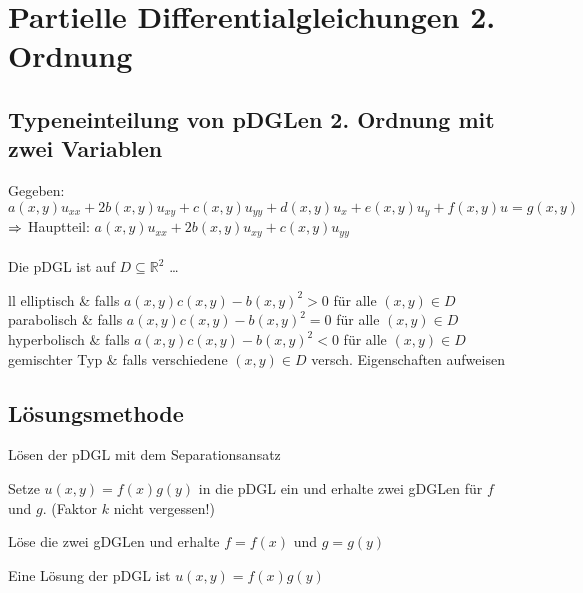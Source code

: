 \documentclass[german,color,5pt]{latex4ei/latex4ei_fs}
\begin{document}
\section{Partielle Differentialgleichungen 2. Ordnung}
\begin{sectionbox}
	\subsection{Typeneinteilung von pDGLen 2. Ordnung mit zwei Variablen}
	Gegeben: $a(x,y)u_{xx}+2b(x,y)u_{xy}+c(x,y)u_{yy}+d(x,y)u_{x}+e(x,y)u_{y}+f(x,y)u=g(x,y)$\\
	$\Rightarrow$ Hauptteil: $a(x,y)u_{xx}+2b(x,y)u_{xy}+c(x,y)u_{yy}$ \\ \\
	Die pDGL ist auf $D\subseteq \mathbb{R}^2$ \dots
	\begin{tablebox}{ll}
		elliptisch & falls $a(x,y)c(x,y)-b(x,y)^2>0 $ für alle $(x,y) \in D $ \\
		parabolisch & falls $a(x,y)c(x,y)-b(x,y)^2=0 $ für alle $(x,y) \in D $ \\
		hyperbolisch & falls $a(x,y)c(x,y)-b(x,y)^2<0 $ für alle $(x,y) \in D $ \\
		gemischter Typ & falls verschiedene $(x,y) \in D $ versch. Eigenschaften aufweisen
	\end{tablebox}
	
	\subsection{Lösungsmethode}
	\label{subsubsec:separationsansatz}
	\begin{cookbox}{Lösen der pDGL mit dem Separationsansatz}
		\item Setze $u(x,y)=f(x)g(y) $ in die pDGL ein und erhalte zwei gDGLen für $f$ und $g$. (Faktor $k$ nicht vergessen!)
		\item Löse die zwei gDGLen und erhalte $f=f(x)$ und $g=g(y) $
		\item Eine Lösung der pDGL ist $u(x,y)=f(x)g(y) $
	\end{cookbox}
\end{sectionbox}

\end{document}
